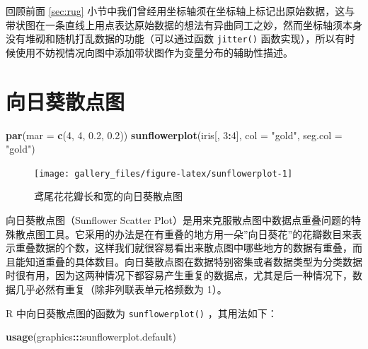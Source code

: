 \documentclass[
  b5paper,
  UTF8,twoside]{book}
\newenvironment{Shaded}{\begin{snugshade}}{\end{snugshade}}
\newcommand{\AttributeTok}[1]{\textcolor[rgb]{0.13,0.29,0.53}{#1}}
\newcommand{\DecValTok}[1]{\textcolor[rgb]{0.00,0.00,0.81}{#1}}
\newcommand{\FloatTok}[1]{\textcolor[rgb]{0.00,0.00,0.81}{#1}}
\newcommand{\FunctionTok}[1]{\textcolor[rgb]{0.13,0.29,0.53}{\textbf{#1}}}
\newcommand{\NormalTok}[1]{#1}
\newcommand{\SpecialCharTok}[1]{\textcolor[rgb]{0.81,0.36,0.00}{\textbf{#1}}}
\newcommand{\StringTok}[1]{\textcolor[rgb]{0.31,0.60,0.02}{#1}}
\begin{document}
回顾前面 \ref{sec:rug} 小节中我们曾经用坐标轴须在坐标轴上标记出原始数据，这与带状图在一条直线上用点表达原始数据的想法有异曲同工之妙，然而坐标轴须本身没有堆砌和随机打乱数据的功能（可以通过函数 \texttt{jitter()} 函数实现），所以有时候使用不妨视情况向图中添加带状图作为变量分布的辅助性描述。

\section{向日葵散点图}\label{sec:sunflowerplot}





\begin{Shaded}
\begin{Highlighting}[]
\FunctionTok{par}\NormalTok{(}\AttributeTok{mar =} \FunctionTok{c}\NormalTok{(}\DecValTok{4}\NormalTok{, }\DecValTok{4}\NormalTok{, }\FloatTok{0.2}\NormalTok{, }\FloatTok{0.2}\NormalTok{))}
\FunctionTok{sunflowerplot}\NormalTok{(iris[, }\DecValTok{3}\SpecialCharTok{:}\DecValTok{4}\NormalTok{], }\AttributeTok{col =} \StringTok{"gold"}\NormalTok{, }\AttributeTok{seg.col =} \StringTok{"gold"}\NormalTok{)}
\end{Highlighting}
\end{Shaded}

\begin{figure}

{\centering \texttt{[image: gallery\_files/figure-latex/sunflowerplot-1]} 

}

\caption[鸢尾花花瓣长和宽的向日葵散点图]{鸢尾花花瓣长和宽的向日葵散点图}\label{fig:sunflowerplot}
\end{figure}

向日葵散点图（Sunflower Scatter Plot）是用来克服散点图中数据点重叠问题的特殊散点图工具。它采用的办法是在有重叠的地方用一朵''向日葵花''的花瓣数目来表示重叠数据的个数，这样我们就很容易看出来散点图中哪些地方的数据有重叠，而且能知道重叠的具体数目。向日葵散点图在数据特别密集或者数据类型为分类数据时很有用，因为这两种情况下都容易产生重复的数据点，尤其是后一种情况下，数据几乎必然有重复（除非列联表单元格频数为 1）。

R 中向日葵散点图的函数为 \texttt{sunflowerplot()} ，其用法如下：

\begin{Shaded}
\begin{Highlighting}[]
\FunctionTok{usage}\NormalTok{(graphics}\SpecialCharTok{:::}\NormalTok{sunflowerplot.default)}
\end{Highlighting}
\end{Shaded}
\end{document}
